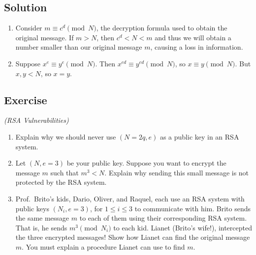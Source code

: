 \documentclass{article}
\newcounter{counter}
\newcommand{\Exercise}{Exercise \stepcounter{counter}\thecounter}
\begin{document}
\subsection*{Solution}
    \begin{enumerate}
        \item Consider $m \equiv c^{d} \pmod{N}$, the decryption formula used to obtain the original message. If $m > N$, then $c^{d} < N < m$ and thus we will obtain a number smaller than our original message $m$, causing a loss in information.
        \item Suppose $x^{e} \equiv y^{e} \pmod{N}$. Then $x^{ed} \equiv y^{ed} \pmod{N}$, so $x \equiv y \pmod{N}$. But $x, y < N$, so $x = y$.
    \end{enumerate}

\subsection*{\Exercise}
    \textit{(RSA Vulnerabilities)}
    \begin{enumerate}
        \item Explain why we should never use $(N = 2q, e)$ as a public key in an RSA system.
        \item Let $(N, e = 3)$ be your public key. Suppose you want to encrypt the message $m$ such that $m^{3} < N$. Explain why sending this small message is not protected by the RSA system.
        \item Prof.\ Brito's kids, Dario, Oliver, and Raquel, each use an RSA system with public keys $(N_{i}, e = 3)$, for $1 \le i \le 3$ to communicate with him. Brito sends the same message $m$ to each of them using their corresponding RSA system. That is, he sends $m^{3} \pmod{N_{i}}$ to each kid. Lianet (Brito's wife!), intercepted the three encrypted messages! Show how Lianet can find the original message $m$. You must explain a procedure Lianet can use to find $m$.
    \end{enumerate}
\end{document}
